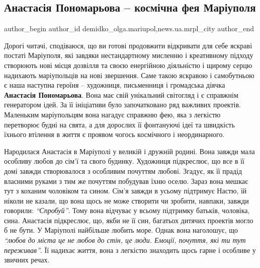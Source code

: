  
 
 
 
 
 
\subsection{Анастасія Пономарьова – космічна фея Маріуполя}
\label{sec:09_04_2019.stz.news.ua.mrpl_city.1.anastasia_ponomareva_kosm_feja_mrpl}
 
\ifcmt
 author_begin
   author_id demidko_olga.mariupol,news.ua.mrpl_city
 author_end
\fi


Дорогі читачі, сподіваюся, що ви готові продовжити відкривати для себе яскраві
постаті Маріуполя, які завдяки нестандартному мисленню і креативному підходу
створюють нові місця дозвілля та своєю енергійною діяльністю і щирому серцю
надихають маріупольців на нові звершення. Саме такою яскравою і самобутньою є
наша наступна героїня – художниця, письменниця і громадська діячка \textbf{Анастасія
Пономарьова}. Вона має свій унікальний світогляд і є справжнім генератором ідей.
За її ініціативи було започатковано ряд важливих проектів. Маленьким
маріупольцям вона нагадує справжню фею, яка з легкістю перетворює будні на
свята, а для дорослих її фонтануючі ідеї та швидкість їхнього втілення в життя
є проявом чогось космічного і неординарного.



Народилася Анастасія в Маріуполі у великій і дружній родині. Вона завжди мала
особливу любов до сім'ї та свого будинку. Художниця підкреслює, що все в її
домі завжди створювалося з особливим почуттям любові. Згадує, як її прадід
власними руками з тим же почуттям побудував їхню оселю. Зараз вона мешкає тут з
коханим чоловіком та сином. Сім'я завжди в усьому підтримує Настю, їй ніколи не
казали, що вона щось не може створити чи зробити, навпаки, завжди говорили:
\emph{\enquote{Спробуй}}. Тому вона відчуває у всьому підтримку батьків, чоловіка, сина.
Анастасія підкреслює, що, якби не її син, багатьох дитячих проектів могло б не
бути. У Маріуполі найбільше любить море. Однак вона наголошує, що \emph{\enquote{любов до
міста це не любов до стін, це люди. Емоції, почуття, які ти тут переживав}}. Її
надихає життя, вона з легкістю знаходить щось гарне і особливе у звичних речах.

